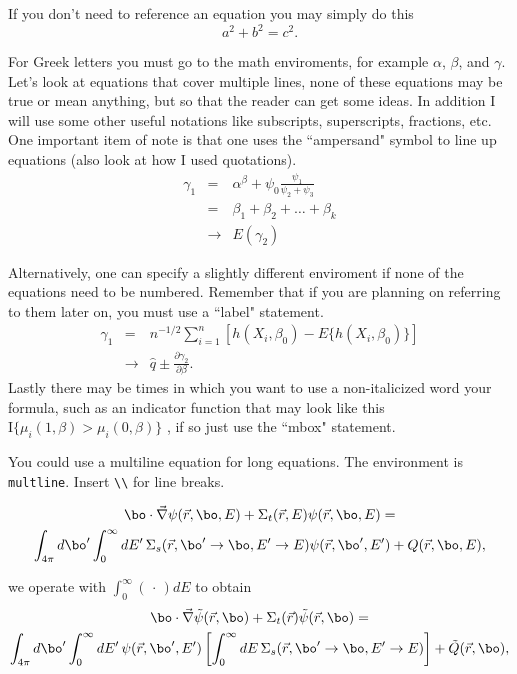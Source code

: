If you don't need to reference an equation you may simply do this 
\[
  a^2 + b^2 = c^2.
\]

For Greek letters you must go to the math enviroments, for example 
$\alpha$, $\beta$, and $\gamma$.  Let's look at equations that cover 
multiple lines, none of these equations may be true or mean anything, but so 
that the reader can get some ideas.  In addition I will use some other useful 
notations like subscripts, superscripts, fractions, etc.  One important item 
of note is that one uses the ``ampersand" symbol to line up equations 
(also look at how I used quotations).
%
\begin{eqnarray}
\gamma_1 & = & \alpha^{\beta} + \psi_0 \frac{\psi_1}{\psi_2+\psi_3} \label{eq.two} \\
& = & \beta_1 + \beta_2 + \ldots + \beta_k \nonumber\\
& \rightarrow & E(\gamma_2) 
\end{eqnarray}

Alternatively, one can specify a slightly different enviroment if none of 
the equations need to be numbered.  Remember that if you are planning on 
referring to them later on, you must use a ``label" statement.
%
\begin{eqnarray*}
\gamma_1 & = & n^{-1/2} \displaystyle \sum_{i=1}^n \left[h(X_i,\beta_0)-E\{h(X_i,\beta_0)\}\right]\\
& \rightarrow & \hat q \pm \frac{\partial \gamma_2}{\partial \beta}. 
\end{eqnarray*}  
Lastly there may be times in which you want to use a non-italicized word 
your formula, such as an indicator function that may look like this 
$\mbox{I}\{\mu_i(1,\beta)>\mu_i(0,\beta)\}$ , if so just use the 
``mbox" statement.


You could use a multiline equation for long equations.  The environment
is \texttt{multline}.  Insert \verb^\\^ for line breaks.

\begin{multline*}
\bo \cdot \vec{\nabla} \psi(\vec{r},\bo ,E) + \Sigma_t(\vec{r},E)\psi(\vec{r},\bo ,E) = \\
  \int_{4\pi} d\bo' \int_0^{\infty} dE' \, \Sigma_s(\vec{r},\bo'\to\bo,E'\to E)\psi(\vec{r},\bo',E') + Q(\vec{r},\bo ,E),
\end{multline*}


we operate with $\displaystyle\int_{0}^{\infty}\left(\,\cdot\,\right) dE$
to obtain
\begin{multline*}
  \bo \cdot \vec{\nabla} \tilde{\psi}(\vec{r},\bo)
  + \Sigma_t(\vec{r})\tilde{\psi}(\vec{r},\bo) = \\
  \int_{4\pi} d\bo' \int_0^{\infty} dE' \, \psi(\vec{r},\bo',E')
  \left [ \int_{0}^{\infty} dE \, \Sigma_s(\vec{r},\bo'\to\bo,E'\to E)
  \right ] + \tilde{Q}(\vec{r},\bo),
\end{multline*}

